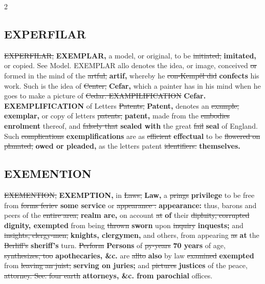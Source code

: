 \documentclass[10pt]{article}
\begin{document}
\begin{multicols}{2}
\subsection*{EXPERFILAR}
\sout{EXPERFILAR,} \textbf{EXEMPLAR,} a model, or original, to be \sout{initiated,} \textbf{imitated,} or copied. See Model. EXEMPLAR allo denotes the idea, or image, conceived \sout{or} formed in the mind of the \sout{artful,} \textbf{artif,} whereby he \sout{con-Kempêl did} \textbf{confects} his work. Such is the idea of \sout{Center,} \textbf{Cefar,} which a painter has in his mind when he goes to make a picture of \sout{Cedar. EXAMPILIFICATION} \textbf{Cefar. EXEMPLIFICATION} of Letters \sout{Patents,} \textbf{Patent,} denotes an \sout{example,} \textbf{exemplar,} or copy of letters \sout{patents,} \textbf{patent,} made from the \sout{embodies} \textbf{enrolment} thereof, and \sout{falsely that} \textbf{sealed with} the great \sout{fail} \textbf{seal} of England. Such \sout{complications} \textbf{exemplifications} are as \sout{efficient} \textbf{effectual} to be \sout{flowered on planated,} \textbf{owed or pleaded,} as the letters patent \sout{identifiers.} \textbf{themselves.}

\subsection*{EXEMENTION}
\sout{EXEMENTION,} \textbf{EXEMPTION,} in \sout{Laws,} \textbf{Law,} a \sout{prings} \textbf{privilege} to be free from \sout{forms feriev} \textbf{some service} or \sout{appearance :} \textbf{appearance:} thus, barons and peers of the \sout{entire area,} \textbf{realm are,} on account \sout{at} \textbf{of} their \sout{dipluity, corrupted} \textbf{dignity, exempted} from being \sout{thrown} \textbf{sworn} upon \sout{inquiry} \textbf{inquests;} and \sout{insights, clergy-men,} \textbf{knights, clergymen,} and others, from appearing \sout{as} \textbf{at} the \sout{Berliff's} \textbf{sheriff's} turn. \sout{Perform} \textbf{Persons} of \sout{py-years} \textbf{70 years} of age, \sout{synthesizes, too} \textbf{apothecaries, \&c.} are \sout{allto} \textbf{also} by law \sout{examined} \textbf{exempted} from \sout{leaving an juist;} \textbf{serving on juries;} and \sout{pictures} \textbf{justices} of the peace, \sout{attorney. See: four earth} \textbf{attorneys, \&c. from parochial} offices.


\end{multicols}
\end{document}
